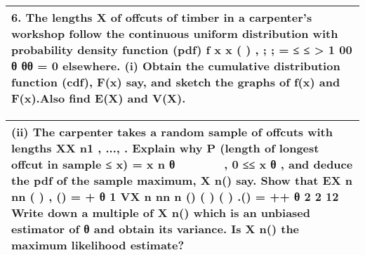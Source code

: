 \documentclass[a4paper,12pt]{article}
\begin{document}
\begin{table}[ht!]
 \centering
 \begin{tabular}{|p{15cm}|}
 \hline
6. The lengths X of offcuts of timber in a carpenter’s workshop follow the continuous uniform distribution with probability density function (pdf)
f x x ( ) , ; ; = ≤ ≤ > 1 00 θ θθ  = 0  elsewhere.
(i) Obtain the cumulative distribution function (cdf), F(x) say, and sketch the graphs of
f(x) and F(x).Also find E(X) and V(X).

\\ \hline
  \end{tabular}
\end{table}

  \begin{table}[ht!]
 \centering
 \begin{tabular}{|p{15cm}|}
 \hline  
(ii) The carpenter takes a random sample of offcuts with lengths XX n1 , ..., . Explain why
P (length of longest offcut in sample ≤ x) = 
x n θ
  
   ,  0 ≤≤ x θ ,
and deduce the pdf of the sample maximum, X n() say.
Show that
EX
n nn ( ) , () = + θ 1
VX
n
nn
n ()
( ) ( ) .() = ++ θ 2 2 12
Write down a multiple of  X n() which is an unbiased estimator of 
θ
 and obtain its
variance.
Is  X n() the maximum likelihood estimate? \\ \hline 
  \end{tabular}
\end{table}
\end{document}
